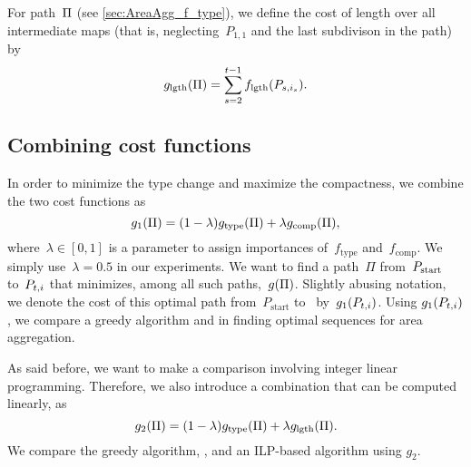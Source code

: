 \documentclass[acmsmall,natbib=false]{acmart}
\begin{document}
For path~$\Pi$ (see \sect\ref{sec:AreaAgg_f_type}), 
we define the cost of length over all 
intermediate maps 
(that is, neglecting~$P_{1,1}$ 
and the last subdivison in the path) by
\begin{equation}
\label{eq:g_length}
g_\mathrm{lgth}(\Pi)=
\sum_{s=2}^{t-1}f_{\mathrm{lgth}}(P_{s,i_s}).
\end{equation}



\subsection{Combining cost functions}
\label{sec:AreaAgg_Combining}
In order to minimize the type change 
and maximize the compactness,
we combine the two cost functions as
\begin{equation}
\label{eq:g_1}
g_1(\Pi)= (1-\lambda)g_\mathrm{type}(\Pi)
+\lambda g_\mathrm{comp}(\Pi),
\end{equation}
where~$\lambda \in [0,1]$ is a parameter 
to assign importances 
of~$f_\mathrm{type}$ and~$f_\mathrm{comp}$.
We simply use~$\lambda=0.5$ in our experiments. 
We want to find a path~$\Pi$ from~$P_\mathrm{start}$ to~$P_{t,i}$ 
that minimizes, among all such paths,~$g(\Pi)$.
Slightly abusing notation, we denote the cost of
this optimal path from~${P}_{\mathrm{start}}$ to~\Pnode 
by~$g_1(P_{t,i})$.
Using $g_1(P_{t,i})$, we compare a greedy algorithm and \Astar
in finding optimal sequences for area aggregation.

As said before, we want to make a comparison involving
integer linear programming.
Therefore, we also introduce a combination
that can be computed linearly, as
\begin{equation}
\label{eq:g_2}
g_2(\Pi)= (1-\lambda)g_\mathrm{type}(\Pi)
+\lambda g_\mathrm{lgth}(\Pi).
\end{equation}
We compare the greedy algorithm, \Astar, and an ILP-based 
algorithm using $g_2$.
\end{document}
